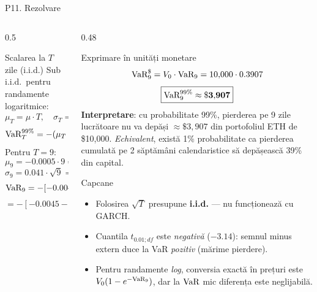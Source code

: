 \documentclass[9pt, aspectratio=169, t]{beamer}
\begin{document}
\begin{frame}[shrink=22]{P11. Rezolvare}
\begin{columns}[T]
\begin{column}{0.5\textwidth}
\begin{block}{Scalarea la $T$ zile (i.i.d.)}
Sub i.i.d.\ pentru randamente logaritmice:
\[
\mu_T = \mu\cdot T, \quad \sigma_T = \sigma\cdot\sqrt T
\]
\[
\text{VaR}_T^{99\%} = -(\mu_T + t_{0.01;df}\cdot\sigma_T)
\]
Pentru $T=9$:
\[
\mu_9 = -0.0005\cdot 9 = -0.0045
\]
\[
\sigma_9 = 0.041\cdot \sqrt 9 = 0.041\cdot 3 = 0.123
\]
\[
\text{VaR}_9 = -[-0.0045 + (-3.14)\cdot 0.123]
\]
\[
= -[-0.0045 - 0.3862] = \mathbf{0.3907}
\]
\end{block}
\end{column}
\begin{column}{0.48\textwidth}
\begin{block}{Exprimare în unități monetare}
\[
\text{VaR}_9^{\$} = V_0\cdot\text{VaR}_9 = 10{,}000\cdot 0.3907
\]
\[
\boxed{\text{VaR}_9^{99\%} \approx \mathbf{\$3{,}907}}
\]
\textbf{Interpretare}: cu probabilitate 99\%, pierderea pe 9 zile lucrătoare nu va depăși $\approx\$3{,}907$ din portofoliul ETH de \$10{,}000. \emph{Echivalent}, există 1\% probabilitate ca pierderea cumulată pe 2 săptămâni calendaristice să depășească 39\% din capital.
\end{block}
\begin{alertblock}{Capcane}
\begin{itemize}\setlength{\itemsep}{0pt}
    \item Folosirea $\sqrt T$ presupune \textbf{i.i.d.} --- nu funcționează cu GARCH.
    \item Cuantila $t_{0.01;df}$ este \emph{negativă} ($-3.14$): semnul minus extern duce la VaR \emph{pozitiv} (mărime pierdere).
    \item Pentru randamente \emph{log}, conversia exactă în prețuri este $V_0(1-e^{-\text{VaR}_9})$, dar la $\text{VaR}$ mic diferența este neglijabilă.
\end{itemize}
\end{alertblock}
\end{column}
\end{columns}
\end{frame}
\end{document}
